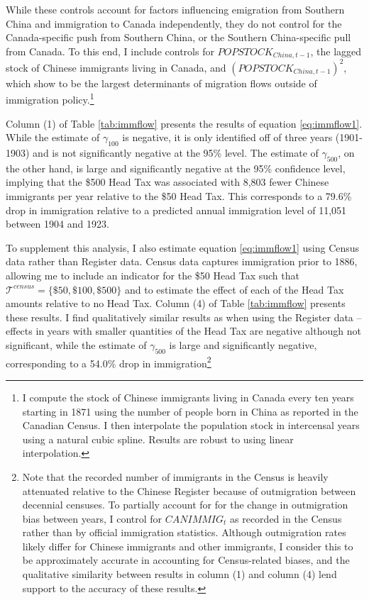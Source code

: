 While these controls account for factors influencing emigration from Southern China and immigration to Canada independently, they do not control for the Canada-specific push from Southern China, or the Southern China-specific pull from Canada. To this end, I include controls for $POPSTOCK_{China,t-1}$, the lagged stock of Chinese immigrants living in Canada, and $(POPSTOCK_{China,t-1})^2$, which \citet{Clarketal2007} show to be the largest determinants of migration flows outside of immigration policy.\footnote{I compute the stock of Chinese immigrants living in Canada every ten years starting in 1871 using the number of people born in China as reported in the Canadian Census. I then interpolate the population stock in intercensal years using a natural cubic spline. Results are robust to using linear interpolation.}

Column (1) of Table \ref{tab:immflow} presents the results of equation \eqref{eq:immflow1}. While the estimate of $\gamma_{100}$ is negative, it is only identified off of three years (1901-1903) and is not significantly negative at the 95\% level. The estimate of $\gamma_{500}$, on the other hand, is large and significantly negative at the 95\% confidence level, implying that the \$500 Head Tax was associated with 8,803 fewer Chinese immigrants per year relative to the \$50 Head Tax. This corresponds to a 79.6\% drop in immigration relative to a predicted annual immigration level of 11,051 between 1904 and 1923. 

To supplement this analysis, I also estimate equation \eqref{eq:immflow1} using Census data rather than Register data. Census data captures immigration prior to 1886, allowing me to include an indicator for the \$50 Head Tax such that $\mathcal{T}^{census} = \{\$50,\$100,\$500\}$ and to estimate the effect of each of the Head Tax amounts relative to no Head Tax. Column (4) of Table \ref{tab:immflow} presents these results. 
I find qualitatively similar results as when using the Register data -- effects in years with smaller quantities of the Head Tax are negative although not significant, while the estimate of $\gamma_{500}$ is large and significantly negative, corresponding to a 54.0\% drop in immigration\footnote{Note that the recorded number of immigrants in the Census is heavily attenuated relative to the Chinese Register because of outmigration between decennial censuses. 
To partially account for for the change in outmigration bias between years, I control for $CANIMMIG_t$ as recorded in the Census rather than by official immigration statistics. Although outmigration rates likely differ for Chinese immigrants and other immigrants, I consider this to be approximately accurate in accounting for Census-related biases, and the qualitative similarity between results in column (1) and column (4) lend support to the accuracy of these results.}

